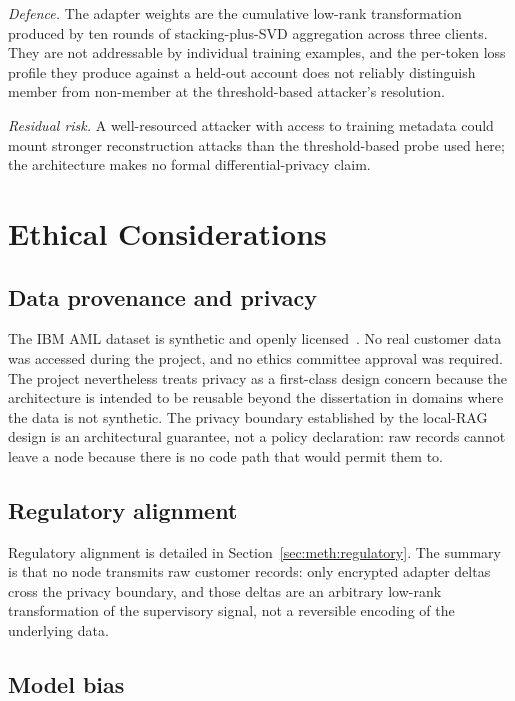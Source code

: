 \documentclass{report}
\begin{document}
\textit{Defence.} The adapter weights are the cumulative low-rank transformation produced by ten rounds of stacking-plus-SVD aggregation across three clients. They are not addressable by individual training examples, and the per-token loss profile they produce against a held-out account does not reliably distinguish member from non-member at the threshold-based attacker's resolution.

\textit{Residual risk.} A well-resourced attacker with access to training metadata could mount stronger reconstruction attacks than the threshold-based probe used here; the architecture makes no formal differential-privacy claim.

\section{Ethical Considerations}
\label{sec:meth:ethics}

\subsection{Data provenance and privacy}

The IBM AML dataset is synthetic and openly licensed~\cite{weber2018scalablegraphlearningantimoney}. No real customer data was accessed during the project, and no ethics committee approval was required. The project nevertheless treats privacy as a first-class design concern because the architecture is intended to be reusable beyond the dissertation in domains where the data is not synthetic. The privacy boundary established by the local-RAG design is an architectural guarantee, not a policy declaration: raw records cannot leave a node because there is no code path that would permit them to.

\subsection{Regulatory alignment}

Regulatory alignment is detailed in Section~\ref{sec:meth:regulatory}. The summary is that no node transmits raw customer records: only encrypted adapter deltas cross the privacy boundary, and those deltas are an arbitrary low-rank transformation of the supervisory signal, not a reversible encoding of the underlying data.

\subsection{Model bias}
\end{document}
